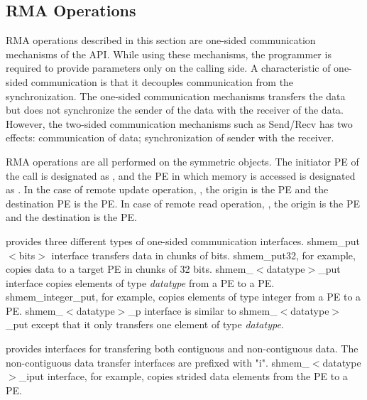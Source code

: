 
\subsection{\ac{RMA} Operations}
\ac{RMA} operations described in this section are one-sided communication
mechanisms of the \openshmem{} \ac{API}. While 
using these mechanisms, the programmer is required to provide parameters
only on the calling side. A characteristic of one-sided communication 
is that it decouples communication from
the synchronization. The one-sided communication mechanisms transfers 
the data but does not synchronize the sender of the data with the receiver
of the data. However, the two-sided communication mechanisms such as Send/Recv has two effects: 
communication of data; synchronization of sender with the receiver.

\openshmem{} \ac{RMA} operations are all performed on the symmetric objects. 
The initiator \ac{PE} of the call is designated as \source{}, and the 
\ac{PE} in which memory is accessed is designated as \target{}. In the case of remote
update operation, \PUT{}, the origin is the \source{} \ac{PE} and the 
destination \ac{PE} is the \target{} PE. In case of remote read operation, \GET{}, 
the origin is the \target{} \ac{PE} and the destination is the \source{} \ac{PE}.

\openshmem{} provides three different types of one-sided communication interfaces. 
shmem\_put$<$bits$>$ interface transfers data in chunks 
of bits. shmem\_put32, for example, copies data to a target \ac{PE} in chunks of 
32 bits. shmem\_$<$datatype$>$\_put interface copies elements of type 
\textit{datatype} from a \source{} \ac{PE} to a \target{} \ac{PE}. 
shmem\_integer\_put, for example, copies elements
of type integer from a \source{} \ac{PE} to a \target{} \ac{PE}. 
shmem\_$<$datatype$>$\_p interface is similar to shmem\_$<$datatype$>$\_put 
except that it only transfers one element of type \textit{datatype}.

\openshmem{} provides interfaces for transfering both contiguous and 
non-contiguous data. The non-contiguous data transfer interfaces are prefixed 
with "i". shmem\_$<$datatype$>$\_iput interface, for example, copies strided
data elements from the \source{} \ac{PE} to a \target{} \ac{PE}. 


